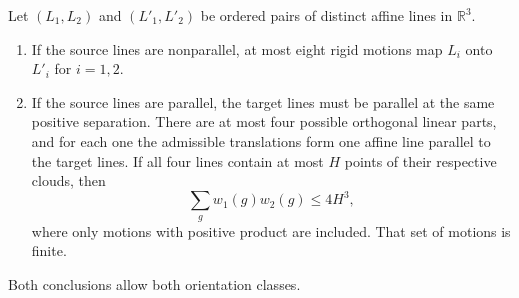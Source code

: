 \begin{lemma}
\label{mot:line-images}
Let \((L_1,L_2)\) and \((L'_1,L'_2)\) be ordered pairs of distinct
affine lines in \(\mathbb R^3\).
\begin{enumerate}
\item If the source lines are nonparallel, at most eight rigid
motions map \(L_i\) onto \(L'_i\) for \(i=1,2\).
\item If the source lines are parallel, the target lines must be
parallel at the same positive separation.  There are at most four
possible orthogonal linear parts, and for each one the admissible
translations form one affine line parallel to the target lines.
If all four lines contain at most \(H\) points of their respective
clouds, then
\begin{equation}
\label{mot:parallel-weight}
 \sum_g w_1(g)w_2(g)\le4H^3,
\end{equation}
where only motions with positive product are included.  That set
of motions is finite.
\end{enumerate}
Both conclusions allow both orientation classes.
\end{lemma}


